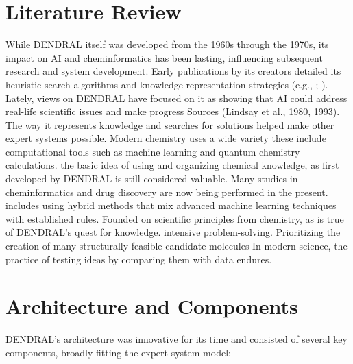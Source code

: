 \documentclass[12pt,a4paper]{article}
\begin{document}
\section{Literature Review}
While DENDRAL itself was developed from the 1960s through the 1970s, its impact on AI and cheminformatics has been lasting, influencing subsequent research and system development. Early publications by its creators detailed its heuristic search algorithms and knowledge representation strategies (e.g., \cite{feigenbaum_lederberg1968}; \cite{buchanan1969}).
Lately, views on DENDRAL have focused on it as
showing that AI could address real-life scientific issues and make progress
Sources (Lindsay et al., 1980, 1993). The way it represents knowledge and searches for solutions
helped make other expert systems possible. Modern chemistry uses a wide variety
these include computational tools such as machine learning and quantum chemistry calculations.
the basic idea of using and organizing chemical knowledge, as first developed by DENDRAL is still considered valuable. Many studies in cheminformatics and drug discovery are now being performed in the present.
includes using hybrid methods that mix advanced machine learning techniques with established rules.
Founded on scientific principles from chemistry, as is true of DENDRAL’s quest for knowledge.
intensive problem-solving. Prioritizing the creation of many structurally feasible candidate molecules
In modern science, the practice of testing ideas by comparing them with data endures.
\section{Architecture and Components}
DENDRAL's architecture was innovative for its time and consisted of several key components, broadly fitting the expert system model:
\end{document}
